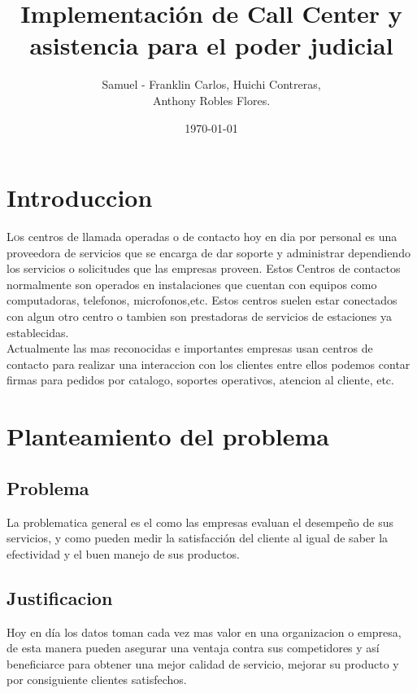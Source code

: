 \documentclass[twoside,twocolumn]{article}
\title{Implementación de Call Center y asistencia para el poder judicial}
\author{Samuel  - Franklin Carlos, Huichi Contreras, \\
Anthony Robles Flores. }
\date{\today}
\begin{document}
\maketitle


\section{Introduccion}
\lettrine[nindent=0em,lines=3]{L}os centros de llamada operadas o de contacto  hoy en dia por personal es una proveedora de servicios que se encarga de dar soporte y administrar dependiendo los servicios o solicitudes que las empresas proveen. Estos Centros de contactos normalmente son operados en instalaciones que cuentan con equipos como computadoras, telefonos, microfonos,etc. Estos centros suelen estar conectados con algun otro centro o tambien son prestadoras de servicios de estaciones ya establecidas.\\
Actualmente las mas reconocidas e importantes empresas usan centros de contacto para realizar una interaccion con los clientes entre ellos podemos 
contar firmas para pedidos por catalogo, soportes operativos, atencion al cliente, etc.

\section{Planteamiento del problema}
\subsection{Problema}
La problematica general es el como las empresas evaluan el desempeño de sus servicios, y como pueden medir la satisfacción del cliente al igual de saber la efectividad y el buen manejo de sus productos.

\subsection{Justificacion}
Hoy en día los datos toman cada vez mas valor en una organizacion o empresa, de esta manera pueden asegurar una ventaja contra sus competidores y así beneficiarce para obtener una mejor calidad de servicio, mejorar su producto y por consiguiente clientes satisfechos.
\end{document}
